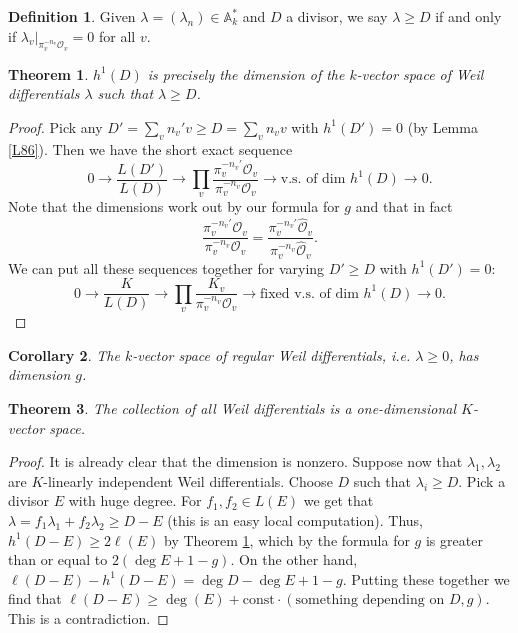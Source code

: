 \documentclass{article}
\theoremstyle{plain}
\newtheorem{thm}{Theorem}
\newtheorem{cor}[thm]{Corollary}
\theoremstyle{definition}
\newtheorem{defn}{Definition}
\theoremstyle{remark}
\begin{document}
\begin{defn}
Given $\lambda=(\lambda_n)\in\mathbb{A}_k^*$ and $D$ a divisor, we say $\lambda\geq D$ if and only if $\lambda_v|_{\pi_v^{-n_v}\mathcal{O}_v}=0$ for all $v$.
\end{defn}

\begin{thm}
\label{L88}
$h^1(D)$ is precisely the dimension of the $k$-vector space of Weil differentials $\lambda$ such that $\lambda\geq D$.
\end{thm}
\begin{proof}
Pick any $D'=\sum_vn_v'v\geq D=\sum_vn_vv$ with $h^1(D')=0$ (by Lemma \ref{L86}). Then we have the short exact sequence
\[0\longrightarrow \frac{L(D')}{L(D)}\longrightarrow \prod_v\frac{\pi_v^{-n_v'}\mathcal{O}_v}{\pi_v^{-n_v}\mathcal{O}_v}\longrightarrow \text{v.s. of dim } h^1(D)\longrightarrow0.\]
Note that the dimensions work out by our formula for $g$ and that in fact
\[\frac{\pi_v^{-n_v'}\mathcal{O}_v}{\pi_v^{-n_v}\mathcal{O}_v}=\frac{\pi_v^{-n_v'}\hat{\mathcal{O}}_v}{\pi_v^{-n_v}\hat{\mathcal{O}}_v}.\]
We can put all these sequences together for varying $D'\geq D$ with $h^1(D')=0$:
\[0\longrightarrow\frac{K}{L(D)}\longrightarrow\prod_v\frac{K_v}{\pi_v^{-n_v}\mathcal{O}_v}\longrightarrow\text{fixed v.s. of dim }h^1(D)\longrightarrow 0.\]
\end{proof}

\begin{cor}
The $k$-vector space of regular Weil differentials, i.e. $\lambda\geq 0$, has dimension $g$.
\end{cor}

\begin{thm}
\label{L90}
The collection of all Weil differentials is a one-dimensional $K$-vector space.
\end{thm}
\begin{proof}
It is already clear that the dimension is nonzero. Suppose now that $\lambda_1,\lambda_2$ are $K$-linearly independent Weil differentials. Choose $D$ such that $\lambda_i\geq D$. Pick a divisor $E$ with huge degree. For $f_1,f_2\in L(E)$ we get that $\lambda=f_1\lambda_1+f_2\lambda_2\geq D-E$ (this is an easy local computation). Thus, $h^1(D-E)\geq 2\ell(E)$ by Theorem \ref{L88}, which by the formula for $g$ is greater than or equal to $2(\deg E+1-g)$. On the other hand, $\ell(D-E)-h^1(D-E)=\deg D-\deg E+1-g$. Putting these together we find that $\ell(D-E)\geq \deg(E)+\text{const}\cdot(\text{something depending on } D, g)$. This is a contradiction.
\end{proof}
\end{document}
